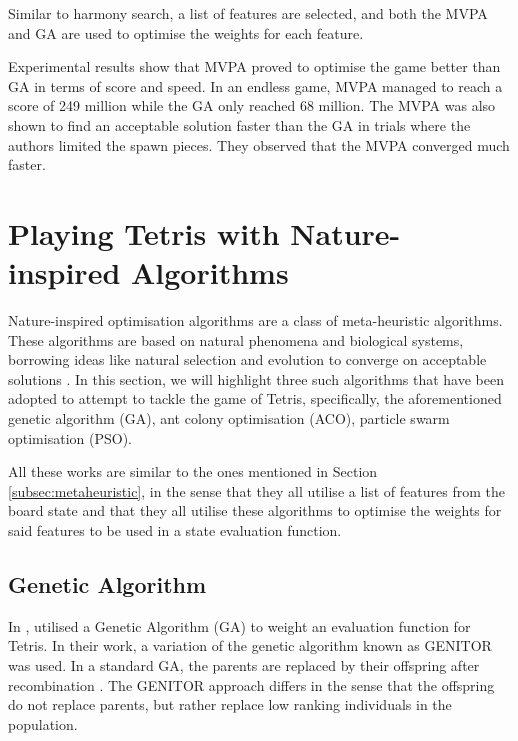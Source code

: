 \documentclass[a4paper, 12pt]{extreport}
\begin{document}
					Similar to harmony search, a list of features are selected, and both the MVPA and GA are used to optimise the weights for each feature.
					
					Experimental results show that MVPA proved to optimise the game better than GA in terms of score and speed. In an endless game, MVPA managed to reach a score of 249 million while the GA only reached 68 million. The MVPA was also shown to find an acceptable solution faster than the GA in trials where the authors limited the spawn pieces. They observed that the MVPA converged much faster.
						
		\section{Playing Tetris with Nature-inspired Algorithms}
		
			Nature-inspired optimisation algorithms are a class of meta-heuristic algorithms. These algorithms are based on natural phenomena and biological systems, borrowing ideas like natural selection and evolution to converge on acceptable solutions \cite{nia-soft-computing}. In this section, we will highlight three such algorithms that have been adopted to attempt to tackle the game of Tetris, specifically, the aforementioned genetic algorithm (GA), ant colony optimisation (ACO), particle swarm optimisation (PSO).
			
			All these works are similar to the ones mentioned in Section \ref{subsec:metaheuristic}, in the sense that they all utilise a list of features from the board state and that they all utilise these algorithms to optimise the weights for said features to be used in a state evaluation function.
		
			\subsection{Genetic Algorithm}
			
				In \citeyear{tetris-ga-flom-robinson}, \citeauthor{tetris-ga-flom-robinson} \cite{tetris-ga-flom-robinson} utilised a Genetic Algorithm (GA) to weight an evaluation function for Tetris. In their work, a variation of the genetic algorithm known as GENITOR was used. In a standard GA, the parents are replaced by their offspring after recombination \cite{genitor}. The GENITOR approach differs in the sense that the offspring do not replace parents, but rather replace low ranking individuals in the population.
				
\end{document}
